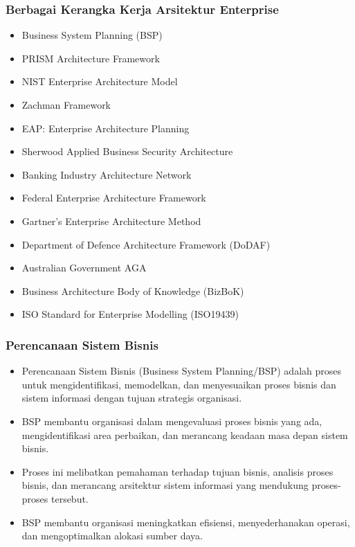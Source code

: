 \documentclass{beamer}
\begin{document}
	
	\begin{frame}
		\frametitle{Berbagai Kerangka Kerja Arsitektur Enterprise}
		\begin{itemize}
			\item Business System Planning (BSP)
			\item PRISM Architecture Framework
			\item NIST Enterprise Architecture Model
			\item Zachman Framework
			\item EAP: Enterprise Architecture Planning
			\item Sherwood Applied Business Security Architecture
			\item Banking Industry Architecture Network
			\item Federal Enterprise Architecture Framework
			\item Gartner’s Enterprise Architecture Method
			\item Department of Defence Architecture Framework (DoDAF)
			\item Australian Government AGA
			\item Business Architecture Body of Knowledge (BizBoK)
			\item ISO Standard for Enterprise Modelling (ISO19439)
		\end{itemize}
	\end{frame}
	
	\begin{frame}
		\frametitle{Perencanaan Sistem Bisnis}
		\begin{itemize}
			\item Perencanaan Sistem Bisnis (Business System Planning/BSP) adalah proses untuk mengidentifikasi, memodelkan, dan menyesuaikan proses bisnis dan sistem informasi dengan tujuan strategis organisasi.
			\item BSP membantu organisasi dalam mengevaluasi proses bisnis yang ada, mengidentifikasi area perbaikan, dan merancang keadaan masa depan sistem bisnis.
			\item Proses ini melibatkan pemahaman terhadap tujuan bisnis, analisis proses bisnis, dan merancang arsitektur sistem informasi yang mendukung proses-proses tersebut.
			\item BSP membantu organisasi meningkatkan efisiensi, menyederhanakan operasi, dan mengoptimalkan alokasi sumber daya.
		\end{itemize}
	\end{frame}
	
\end{document}
